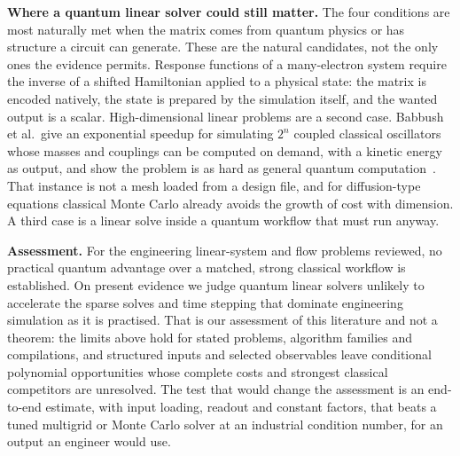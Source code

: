 \documentclass[10pt,a4paper]{article}
\begin{document}
\textbf{Where a quantum linear solver could still matter.} The four conditions are most naturally met when the matrix comes from quantum physics or has structure a circuit can generate. These are the natural candidates, not the only ones the evidence permits. Response functions of a many-electron system require the inverse of a shifted Hamiltonian applied to a physical state: the matrix is encoded natively, the state is prepared by the simulation itself, and the wanted output is a scalar. High-dimensional linear problems are a second case. Babbush et al.\ give an exponential speedup for simulating $2^n$ coupled classical oscillators whose masses and couplings can be computed on demand, with a kinetic energy as output, and show the problem is as hard as general quantum computation~\cite{babbush2023osc}. That instance is not a mesh loaded from a design file, and for diffusion-type equations classical Monte Carlo already avoids the growth of cost with dimension. A third case is a linear solve inside a quantum workflow that must run anyway.

\textbf{Assessment.} For the engineering linear-system and flow problems reviewed, no practical quantum advantage over a matched, strong classical workflow is established. On present evidence we judge quantum linear solvers unlikely to accelerate the sparse solves and time stepping that dominate engineering simulation as it is practised. That is our assessment of this literature and not a theorem: the limits above hold for stated problems, algorithm families and compilations, and structured inputs and selected observables leave conditional polynomial opportunities whose complete costs and strongest classical competitors are unresolved. The test that would change the assessment is an end-to-end estimate, with input loading, readout and constant factors, that beats a tuned multigrid or Monte Carlo solver at an industrial condition number, for an output an engineer would use.
\end{document}
